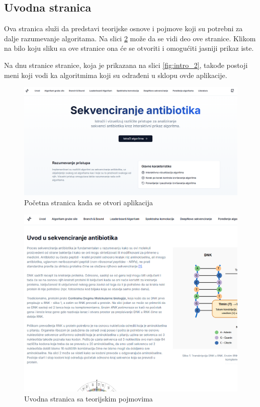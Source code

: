 \documentclass[12pt,oneside]{memoir}
\begin{document}
\subsection{Uvodna stranica}

Ova stranica služi da predstavi teorijske osnove i pojmove koji su potrebni za dalje razumevanje algoritama. Na slici \ref{fig:intro_1} može da se vidi deo ove stranice. Klikom na bilo koju sliku sa ove stranice ona će se otvoriti i omogućiti jasniji prikaz iste.

Na dnu stranice stranice, koja je prikazana na slici \ref{fig:intro_2}, takođe postoji meni koji vodi ka algoritmima koji su odrađeni u sklopu ovde aplikacije.

\begin{figure}[H]
\centering
\includegraphics[width=1\textwidth]{images/landing_page.png}
\caption{Početna stranica kada se otvori aplikacija}
\label{fig:landing_page}
\end{figure}

\begin{figure}[H]
\centering
\includegraphics[width=1\textwidth]{images/intro_1.png}
\caption{Uvodna stranica sa teorijskim pojmovima}
\label{fig:intro_1}
\end{figure}
\end{document}
